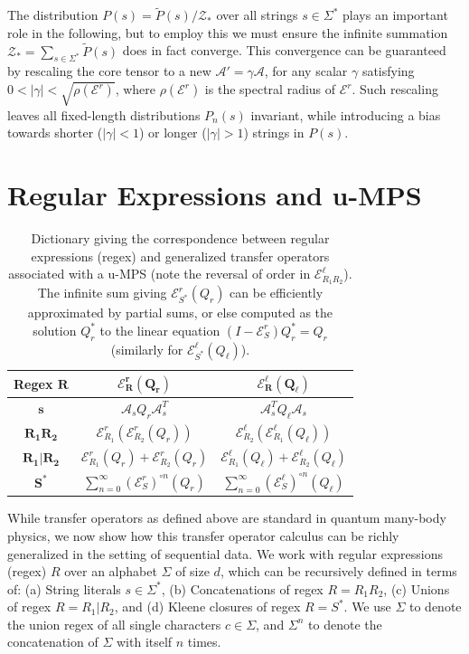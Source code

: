 \documentclass[twoside]{article}
\newcommand{\Z}{\mc{Z}}
\newcommand{\EL}{\mc{E}^{\scriptstyle \ell}}
\newcommand{\ER}{\mc{E}^{\scriptstyle r}}
\newcommand{\QL}{Q_{\ell}}
\newcommand{\QR}{Q_{r}}
\newcommand{\Pt}{\tilde{P}}
\newcommand{\mc}[1]{\mathcal{#1}}
\begin{document}
The distribution $P(s) = \Pt(s) / \Z_*$ over all strings $s\in\Sigma^*$ plays an important role in the following, but to employ this we must ensure the infinite summation $\Z_* = \sum_{s\in\Sigma^*} \Pt(s)$ does in fact converge. This convergence can be guaranteed by rescaling the core tensor to a new $\mc{A}' = \gamma \mc{A}$, for any scalar $\gamma$ satisfying $0 < |\gamma| < \sqrt{\rho(\ER)}$, where $\rho(\ER)$ is the spectral radius of $\ER$. Such rescaling leaves all fixed-length distributions $P_n(s)$ invariant, while introducing a bias towards shorter ($|\gamma| < 1$) or longer ($|\gamma| > 1$) strings in $P(s)$. 

\section{Regular Expressions and u-MPS}
\label{sec:regex}
%
\begin{table}[t]
\setlength\aboverulesep{0.1pt}
\setlength\belowrulesep{0.1pt}
\renewcommand{\arraystretch}{1.7}
\caption{Dictionary giving the correspondence between regular expressions (regex) and generalized transfer operators associated with a u-MPS (note the reversal of order in $\EL_{R_1 R_2}$). The infinite sum giving $\ER_{S^*}(\QR)$ can be efficiently approximated by partial sums, or else computed as the solution $\QR^*$ to the linear equation $(I - \ER_S)\QR^* = \QR$ (similarly for $\EL_{S^*}(\QL)$).}
\label{tab:regex_cp}
\begin{center}
\begin{small}
\begin{sc}
\begin{tabular}{c|c|c}
    \textbf{Regex} $\mathbf{R}$ & $\bm{\ER_R(\QR)}$ & $\bm{\EL_R(\QL)}$ \\
    \midrule
    $\mathbf{s}$ &         $\mc{A}_s \QR \mc{A}_s^T$                             & $\mc{A}_s^T \QL \mc{A}_s$ \\
    $\mathbf{R_1 R_2}$ &   $\ER_{R_1}(\ER_{R_2}(\QR))$                           & $\EL_{R_2}(\EL_{R_1}(\QL))$ \\
    $\mathbf{R_1 | R_2}$ & $\ER_{R_1}(\QR) + \ER_{R_2}(\QR)$                     & $\EL_{R_1}(\QL) + \EL_{R_2}(\QL)$ \\
    $\mathbf{S^*}$ &       $\sum_{n=0}^\infty (\ER_S)^{\circ n}(\QR)$ & $\sum_{n=0}^\infty (\EL_S)^{\circ n}(\QL)$ 
\end{tabular}
\end{sc}
\end{small}
\end{center}
\vskip -0.1in
\end{table}
%
While transfer operators as defined above are standard in quantum many-body physics, we now show how this transfer operator calculus can be richly generalized in the setting of sequential data. We work with regular expressions (regex) $R$ over an alphabet $\Sigma$ of size $d$, which can be recursively defined in terms of: (a) String literals $s\in\Sigma^*$, (b) Concatenations of regex $R = R_1 R_2$, (c) Unions of regex $R = R_1 | R_2$, and (d) Kleene closures of regex $R = S^*$. We use $\Sigma$ to denote the union regex of all single characters $c \in \Sigma$, and $\Sigma^n$ to denote the concatenation of $\Sigma$ with itself $n$ times.
\end{document}
